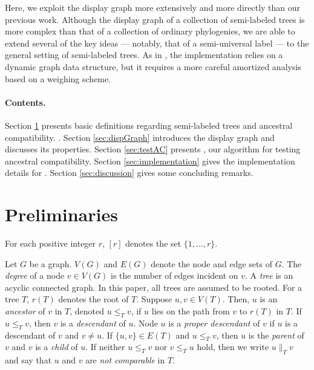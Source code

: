 \documentclass[11pt]{article}
\theoremstyle{definition}
\begin{document}
Here, we exploit the display graph more extensively and more directly than our previous work.  Although the display graph of a collection of semi-labeled trees is more complex than that of a collection of  ordinary phylogenies, we are able to extend several of the key ideas --- notably, that of a semi-universal label --- to the general setting of semi-labeled trees.  As in \cite{DengFB2016}, the implementation relies on a dynamic graph data structure, but it requires a more careful amortized analysis based on a weighing scheme.

\vspace{-1.5\parsep}

\paragraph{Contents.} Section \ref{sec:prelims} presents basic definitions regarding semi-labeled trees and ancestral compatibility.  .  Section \ref{sec:dispGraph} introduces the display graph and discusses its properties.  Section \ref{sec:testAC} presents \SLBuild, our algorithm for testing ancestral compatibility.  Section \ref{sec:implementation} gives the implementation details for \SLBuild.  Section \ref{sec:discussion} gives some concluding remarks.

\section{Preliminaries}\label{sec:prelims}

For each positive integer $r$, $[r]$ denotes the set $\{1, \dots , r\}$.

Let $G$ be a graph. $V(G)$ and $E(G)$ denote the node and edge sets of $G$. The \emph{degree} of a node $v \in V(G)$ is the number of edges incident on $v$. A \emph{tree} is an acyclic connected graph.
In this paper, all trees are assumed to be rooted.  For a tree $T$, $r(T)$ denotes the root of $T$. 
Suppose $u, v \in V(T)$.  Then, $u$ is an \emph{ancestor} of $v$ in $T$, denoted $u \le_T v$, if $u$ lies on the path from $v$ to $r(T)$ in $T$.  If $u \le_T v$, then $v$ is a \emph{descendant} of $u$.  Node $u$ is a \emph{proper descendant} of $v$ if $u$ is a descendant of $v$ and $v \neq u$. If $\{u,v\} \in E(T)$ and $u \le_T v$, then  $u$ is the \emph{parent} of $v$ and $v$ is a \emph{child} of $u$. If neither $u \le_T v$ nor  $v \le_T u$ hold, then  we write $u \parallel_T v$ and say that $u$ and $v$ are \emph{not comparable} in $T$. 

\vspace{-1.5\parsep}
\end{document}
